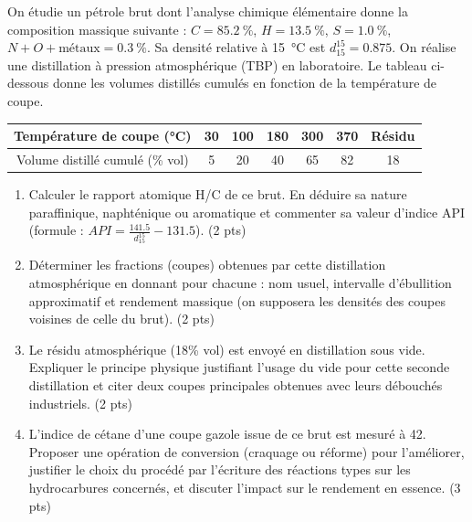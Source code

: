 \documentclass[11pt]{article}
\begin{document}
\begin{exercice}
On étudie un pétrole brut dont l'analyse chimique élémentaire donne la composition massique suivante : $C = \SI{85.2}{\%}$, $H = \SI{13.5}{\%}$, $S = \SI{1.0}{\%}$, $N + O + \text{métaux} = \SI{0.3}{\%}$. Sa densité relative à \SI{15}{\celsius} est $d_{15}^{15} = 0.875$. On réalise une distillation à pression atmosphérique (TBP) en laboratoire. Le tableau ci-dessous donne les volumes distillés cumulés en fonction de la température de coupe.

\begin{center}
\begin{tabular}{|c|c|c|c|c|c|c|}
\hline
Température de coupe (\si{\celsius}) & \SI{30}{} & \SI{100}{} & \SI{180}{} & \SI{300}{} & \SI{370}{} & Résidu \\ \hline
Volume distillé cumulé (\% vol) & 5 & 20 & 40 & 65 & 82 & 18 \\ \hline
\end{tabular}
\end{center}

\begin{enumerate}
\item Calculer le rapport atomique H/C de ce brut. En déduire sa nature paraffinique, naphténique ou aromatique et commenter sa valeur d'indice API (formule : $API = \frac{141.5}{d_{15}^{15}} - 131.5$). \hfill (2 pts)
\item Déterminer les fractions (coupes) obtenues par cette distillation atmosphérique en donnant pour chacune : nom usuel, intervalle d'ébullition approximatif et rendement massique (on supposera les densités des coupes voisines de celle du brut). \hfill (2 pts)
\item Le résidu atmosphérique (18\% vol) est envoyé en distillation sous vide. Expliquer le principe physique justifiant l'usage du vide pour cette seconde distillation et citer deux coupes principales obtenues avec leurs débouchés industriels. \hfill (2 pts)
\item L'indice de cétane d'une coupe gazole issue de ce brut est mesuré à 42. Proposer une opération de conversion (craquage ou réforme) pour l'améliorer, justifier le choix du procédé par l'écriture des réactions types sur les hydrocarbures concernés, et discuter l'impact sur le rendement en essence. \hfill (3 pts)
\end{enumerate}
\end{exercice}
\end{document}
